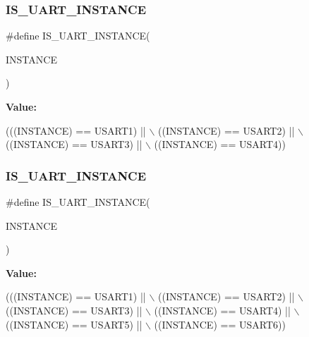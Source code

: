 \subsubsection{\texorpdfstring{I\+S\+\_\+\+U\+A\+R\+T\+\_\+\+I\+N\+S\+T\+A\+N\+CE}{IS\_UART\_INSTANCE}\hspace{0.1cm}{\footnotesize\ttfamily [3/13]}}
{\footnotesize\ttfamily \#define I\+S\+\_\+\+U\+A\+R\+T\+\_\+\+I\+N\+S\+T\+A\+N\+CE(\begin{DoxyParamCaption}\item[{}]{I\+N\+S\+T\+A\+N\+CE }\end{DoxyParamCaption})}

{\bfseries Value\+:}
\begin{DoxyCode}
(((INSTANCE) == USART1) || \(\backslash\)
                                      ((INSTANCE) == USART2) || \(\backslash\)
                                      ((INSTANCE) == USART3) || \(\backslash\)
                                      ((INSTANCE) == USART4))
\end{DoxyCode}
\mbox{\label{group___exported__macro_gacbd2efab4cd39d4867c4dbeacb87e84b}} 
\subsubsection{\texorpdfstring{I\+S\+\_\+\+U\+A\+R\+T\+\_\+\+I\+N\+S\+T\+A\+N\+CE}{IS\_UART\_INSTANCE}\hspace{0.1cm}{\footnotesize\ttfamily [4/13]}}
{\footnotesize\ttfamily \#define I\+S\+\_\+\+U\+A\+R\+T\+\_\+\+I\+N\+S\+T\+A\+N\+CE(\begin{DoxyParamCaption}\item[{}]{I\+N\+S\+T\+A\+N\+CE }\end{DoxyParamCaption})}

{\bfseries Value\+:}
\begin{DoxyCode}
(((INSTANCE) == USART1) || \(\backslash\)
                                      ((INSTANCE) == USART2) || \(\backslash\)
                                      ((INSTANCE) == USART3) || \(\backslash\)
                                      ((INSTANCE) == USART4) || \(\backslash\)
                                      ((INSTANCE) == USART5) || \(\backslash\)
                                      ((INSTANCE) == USART6))
\end{DoxyCode}
\mbox{\label{group___exported__macro_gacbd2efab4cd39d4867c4dbeacb87e84b}} 
